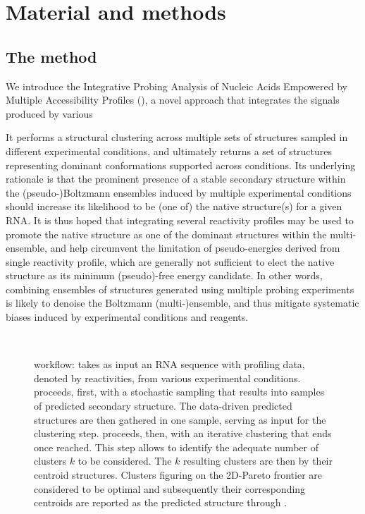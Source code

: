 \documentclass[a4,center,fleqn]{NAR}
\begin{document}
\section*{Material and methods}

\subsection*{The \OurTool{} method}
We introduce the Integrative Probing Analysis of Nucleic Acids Empowered by Multiple Accessibility Profiles (\OurTool{}), a novel approach that integrates the signals produced by various 

It performs a structural clustering across multiple sets of structures sampled in different experimental conditions, and ultimately returns a set of structures representing dominant conformations supported across conditions. Its underlying rationale is that the prominent presence of a stable secondary structure within the  (pseudo-)Boltzmann ensembles induced by multiple experimental conditions should increase its likelihood to be (one of) the native structure(s) for a given RNA. It is thus hoped that integrating several reactivity profiles may be used to promote the native structure as one of the dominant structures within the multi-ensemble, and help circumvent the limitation of pseudo-energies derived from single reactivity profile, which are generally not sufficient to elect the native structure as its minimum (pseudo)-free energy candidate. In other words, combining ensembles of structures generated using multiple probing experiments is likely to denoise the Boltzmann (multi-)ensemble, and thus mitigate systematic biases induced by experimental conditions and reagents.

\begin{figure}
	{\centering\resizebox{.9\columnwidth}{!}{
			
		}\\}
	
	\caption{\OurTool{} workflow: \OurTool{} takes as input an RNA sequence with profiling data, denoted by reactivities, from various experimental conditions. \OurTool{} proceeds, first,  with a stochastic sampling that results into samples of predicted secondary structure. The data-driven predicted structures are then gathered in one sample, serving as input for the clustering step. \OurTool{} proceeds, then, with an iterative clustering that ends once  reached. This step allows to identify the adequate number of clusters $k$ to be considered. The $k$ resulting clusters are then  by their centroid structures. Clusters figuring on the 2D-Pareto frontier are considered to be optimal and subsequently their corresponding centroids are reported as the predicted structure through \OurTool.}\label{fig:approach}
\end{figure}
\end{document}
